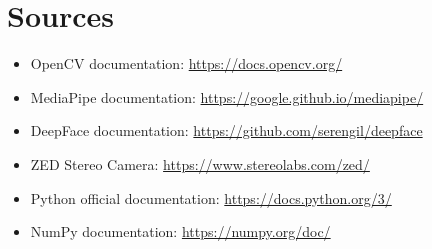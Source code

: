 \documentclass[12pt]{article}
\begin{document}
\section{Sources}
\begin{itemize}
    \item OpenCV documentation: \url{https://docs.opencv.org/}
    \item MediaPipe documentation: \url{https://google.github.io/mediapipe/}
    \item DeepFace documentation: \url{https://github.com/serengil/deepface}
    \item ZED Stereo Camera: \url{https://www.stereolabs.com/zed/}
    \item Python official documentation: \url{https://docs.python.org/3/}
    \item NumPy documentation: \url{https://numpy.org/doc/}
\end{itemize}
\end{document}
